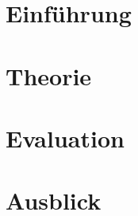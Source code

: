 \documentclass[12pt,ngerman,project]{dbvstudentwork}
\begin{document}
	
	\begin{dbvstudentworkTitlepage}
		
		
		
		
		\Deadline{\today}
		
		
	\end{dbvstudentworkTitlepage}
	
	\tableofcontents
	\clearpage
	
	
	\section{Einführung}
	\label{sec:introduction}
		
		
	\section{Theorie}
	\label{sec:theorie}
		
		
	\section{Evaluation}
	\label{sec:evaluation}
		
		
	\section{Ausblick}
	\label{sec:ausblick}
		

	
	\singlespacing
	
	\clearpage
	
	\clearpage
	\listoffigures %
	\clearpage
	
\end{document}
